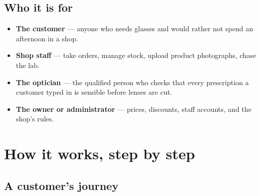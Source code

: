 \documentclass[11pt,a4paper]{report}
\begin{document}
\section{Who it is for}

\begin{itemize}
  \item \textbf{The customer} --- anyone who needs glasses and would rather
        not spend an afternoon in a shop.
  \item \textbf{Shop staff} --- take orders, manage stock, upload product
        photographs, chase the lab.
  \item \textbf{The optician} --- the qualified person who checks that every
        prescription a customer typed in is sensible before lenses are cut.
  \item \textbf{The owner or administrator} --- prices, discounts, staff
        accounts, and the shop's rules.
\end{itemize}

\chapter{How it works, step by step}

\section{A customer's journey}
\end{document}
